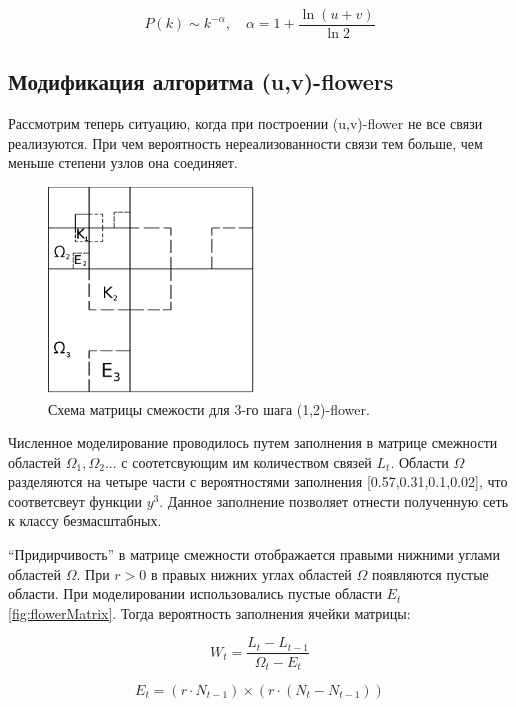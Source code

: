 \documentclass[10pt,aps,pra]{revtex4-1}
\begin{document}
\begin{equation}
P(k) \sim k^{-\alpha}, \quad \alpha = 1+\frac{\ln{(u+v)}}{\ln{2}}
\end{equation}

\subsection{Модификация алгоритма (u,v)-flowers}

Рассмотрим теперь ситуацию, когда при построении (u,v)-flower не все связи реализуются. При чем вероятность нереализованности связи тем больше, чем меньше степени узлов она соединяет.

\begin{figure}[H]

\centering
\includegraphics[height=5.5cm]{graphics/third_n.png}
\caption{
\label{fig:flowerMatrixExceptive}
Схема матрицы смежости для 3-го шага (1,2)-flower.}
\end{figure}

Численное моделирование проводилось путем заполнения в матрице смежности областей $\Omega_1, \Omega_2...$ с соотетсвующим им количеством связей $L_t$. Области $\Omega$ разделяются на четыре части с вероятностями заполнения [0.57,0.31,0.1,0.02], что соответсвеут функции $y^3$.  Данное заполнение позволяет отнести полученную сеть к классу безмасштабных.

``Придирчивость'' в матрице смежности отображается правыми нижними углами областей $\Omega$. При $r>0$ в правых нижних углах областей $\Omega$ появляются пустые области. При моделировании использовались пустые области $E_t$ \ref{fig:flowerMatrix}. Тогда вероятность заполнения ячейки матрицы:

\begin{equation}
W_t=\frac{L_t-L_{t-1}}{\Omega_t-E_t}
\end{equation}

\begin{equation}
E_t= (r \cdot N_{t-1}) \times (r \cdot (N_t - N_{t-1}))
\end{equation}
\end{document}
